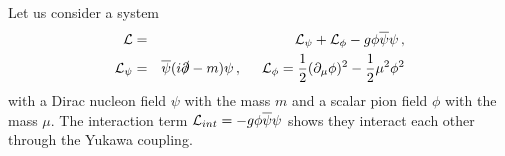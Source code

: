 Let us consider a system
\begin{eqnarray}
{\cal L} 
&=&
{\cal L_{\psi}} + {\cal L_{\phi}}  - g \phi \overline{\psi} \psi\,,
\vspace{2mm}
\\
{\cal L_{\psi}} 
&=&
\overline{\psi} (
i \slashed{\partial} - m ) \psi
\,,
\hspace{5mm}
{\cal L_{\phi}} 
=
\frac{1}{2} (\partial_\mu \phi)^2 
-
\frac{1}{2} \mu^2 \phi^2
\label{eqn:DirYkwLagDens}
\end{eqnarray}
with a Dirac nucleon field $\psi$ with the mass $m$
and a scalar pion field $\phi$ with the mass $\mu$.
The interaction term ${\cal L}_{int} = -g \phi \overline{\psi} \psi$ shows they interact
each other through the Yukawa coupling.

\bigskip

